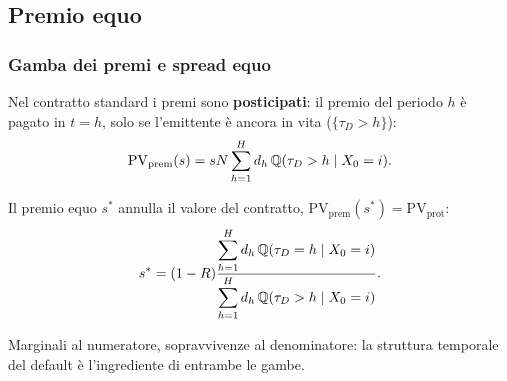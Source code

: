 

\subsection{Premio equo}%

\begin{frame}%
%

\frametitle{Gamba dei premi e spread equo}%
%

%


Nel contratto standard i premi sono \textbf{posticipati}: il premio del
periodo $h$ \`{e} pagato in $t=h$, solo se l'emittente \`{e} ancora in vita
($\{\tau_{D}>h\}$):
\[
\mathrm{PV}_{\mathrm{prem}}(s) = sN \sum_{h=1}^{H} d_{h}\, \mathbb{Q}(\tau_{D}>h\mid
X_{0}=i).
\]


Il premio equo $s^{*}$ annulla il valore del contratto, $\mathrm{PV}%
_{\mathrm{prem}}(s^{*})=\mathrm{PV}_{\mathrm{prot}}$:
\[
s^{*} = (1-R) \frac{ \displaystyle\sum_{h=1}^{H}d_{h}\,\mathbb{Q}(\tau_{D}=h\mid
X_{0}=i) }{ \displaystyle\sum_{h=1}^{H}d_{h}\,\mathbb{Q}(\tau_{D}>h\mid X_{0}=i) }.
\]


\medskip

\begin{center}
{\small Marginali al numeratore, sopravvivenze al denominatore: la struttura
temporale del default \`{e} l'ingrediente di entrambe le gambe.}
\end{center}

%

\transboxout
\end{frame}%


%

